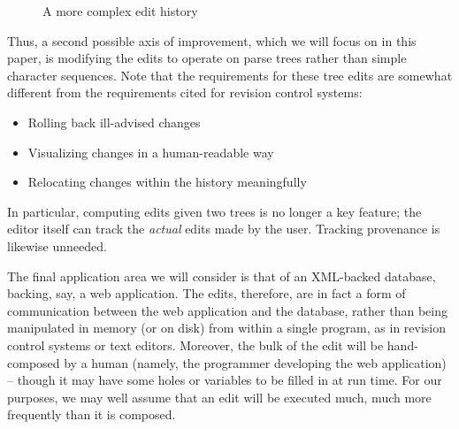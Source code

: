 \documentclass{article}
\newif\ifhighlightnew\highlightnewfalse
\newenvironment{newcontent}{\ifhighlightnew\color{green!55!black}[new]\fi}{\ifhighlightnew\color{black}\fi}
\begin{document}
\begin{newcontent}
\begin{figure}
    \begin{center}
    \end{center}
    \caption{A more complex edit history}
    \label{fig:branching history}
\end{figure}

Thus, a second possible axis of improvement, which we will focus on in this
paper, is modifying the edits to operate on parse trees rather than simple
character sequences. Note that the requirements for these tree edits are
somewhat different from the requirements cited for revision control systems:
\begin{itemize}
    \item Rolling back ill-advised changes
    \item Visualizing changes in a human-readable way
    \item Relocating changes within the history meaningfully
\end{itemize}
In particular, computing edits given two trees is no longer a key feature;
the editor itself can track the \emph{actual} edits made by the user.
Tracking provenance is likewise unneeded.

The final application area we will consider is that of an XML-backed
database, backing, say, a web application. The edits, therefore, are in fact
a form of communication between the web application and the database, rather
than being manipulated in memory (or on disk) from within a single program,
as in revision control systems or text editors. Moreover, the bulk of the
edit will be hand-composed by a human (namely, the programmer developing the
web application) -- though it may have some holes or variables to be filled
in at run time. For our purposes, we may well assume that an edit will be
executed much, much more frequently than it is composed.


\end{newcontent}
\end{document}
